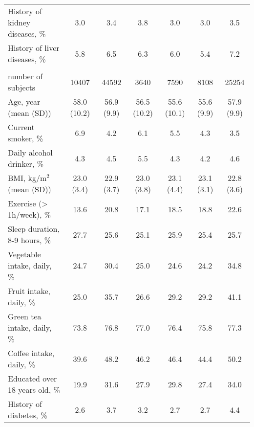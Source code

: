 \documentclass[nutrients,article,submitted,moreauthors,pdftex]{mdpi}
\begin{document}
\begin{table}[h]
{\begin{tabular}[t]{lcccccc}
\rowcolor{gray!6}  \hspace{1em}History of kidney diseases, \% & 3.0 & 3.4 & 3.8 & 3.0 & 3.0 & 3.5\\
\hspace{1em}History of liver diseases, \% & 5.8 & 6.5 & 6.3 & 6.0 & 5.4 & 7.2\\
\rowcolor{gray!6}  \addlinespace[0.3em]
\multicolumn{7}{l}{\textbf{Women (n = 54999)}}\\
\hspace{1em}number of subjects & 10407 & 44592 & 3640 & 7590 & 8108 & 25254\\
\hspace{1em}Age, year (mean (SD)) & 58.0 (10.2) & 56.9 (9.9) & 56.5 (10.2) & 55.6 (10.1) & 55.6 (9.9) & 57.9 (9.9)\\
\rowcolor{gray!6}  \hspace{1em}Current smoker, \% & 6.9 & 4.2 & 6.1 & 5.5 & 4.3 & 3.5\\
\hspace{1em}Daily alcohol drinker, \% & 4.3 & 4.5 & 5.5 & 4.3 & 4.2 & 4.6\\
\rowcolor{gray!6}  \hspace{1em}BMI, kg/m$^2$ (mean (SD)) & 23.0 (3.4) & 22.9 (3.7) & 23.0 (3.8) & 23.1 (4.4) & 23.1 (3.1) & 22.8 (3.6)\\
\hspace{1em}Exercise (> 1h/week), \% & 13.6 & 20.8 & 17.1 & 18.5 & 18.8 & 22.6\\
\rowcolor{gray!6}  \hspace{1em}Sleep duration, 8-9 hours, \% & 27.7 & 25.6 & 25.1 & 25.9 & 25.4 & 25.7\\
\hspace{1em}Vegetable intake, daily, \% & 24.7 & 30.4 & 25.0 & 24.6 & 24.2 & 34.8\\
\rowcolor{gray!6}  \hspace{1em}Fruit intake, daily, \% & 25.0 & 35.7 & 26.6 & 29.2 & 29.2 & 41.1\\
\hspace{1em}Green tea intake, daily, \% & 73.8 & 76.8 & 77.0 & 76.4 & 75.8 & 77.3\\
\rowcolor{gray!6}  \hspace{1em}Coffee intake, daily, \% & 39.6 & 48.2 & 46.2 & 46.4 & 44.4 & 50.2\\
\hspace{1em}Educated over 18 years old, \% & 19.9 & 31.6 & 27.9 & 29.8 & 27.4 & 34.0\\
\rowcolor{gray!6}  \hspace{1em}History of diabetes, \% & 2.6 & 3.7 & 3.2 & 2.7 & 2.7 & 4.4\\

\end{tabular}}
\end{table}
\end{document}
